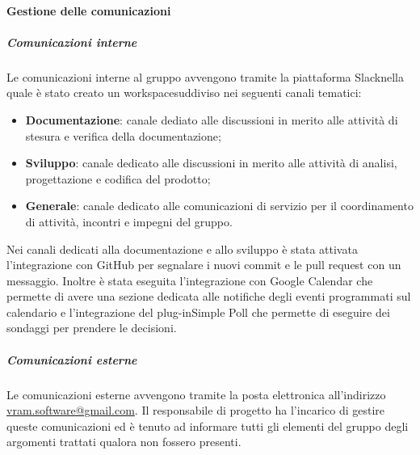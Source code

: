			\paragraph{Gestione delle comunicazioni}
				\subparagraph*{Comunicazioni interne}
					Le comunicazioni interne al gruppo avvengono tramite la piattaforma Slack\glosp nella quale è stato creato un workspace\glosp suddiviso nei seguenti canali tematici:
					\begin{itemize}
						\item \textbf{Documentazione}: canale dediato alle discussioni in merito alle attività di stesura e verifica della documentazione;
						\item \textbf{Sviluppo}: canale dedicato alle discussioni in merito alle attività di analisi, progettazione e codifica del prodotto;
						\item \textbf{Generale}: canale dedicato alle comunicazioni di servizio per il coordinamento di attività, incontri e impegni del gruppo.
					\end{itemize}
					Nei canali dedicati alla documentazione e allo sviluppo è stata attivata l'integrazione con GitHub per segnalare i nuovi commit e le pull request con un messaggio.
					Inoltre è stata eseguita l'integrazione con Google Calendar che permette di avere una sezione dedicata alle notifiche degli eventi programmati sul calendario e l'integrazione del plug-in\glosp Simple Poll che permette di eseguire dei sondaggi per prendere le decisioni.
				\subparagraph*{Comunicazioni esterne}
					Le comunicazioni esterne avvengono tramite la posta elettronica all'indirizzo \url{vram.software@gmail.com}.
					Il responsabile di progetto ha l'incarico di gestire queste comunicazioni ed è tenuto ad informare tutti gli elementi del gruppo degli argomenti trattati qualora non fossero presenti.
